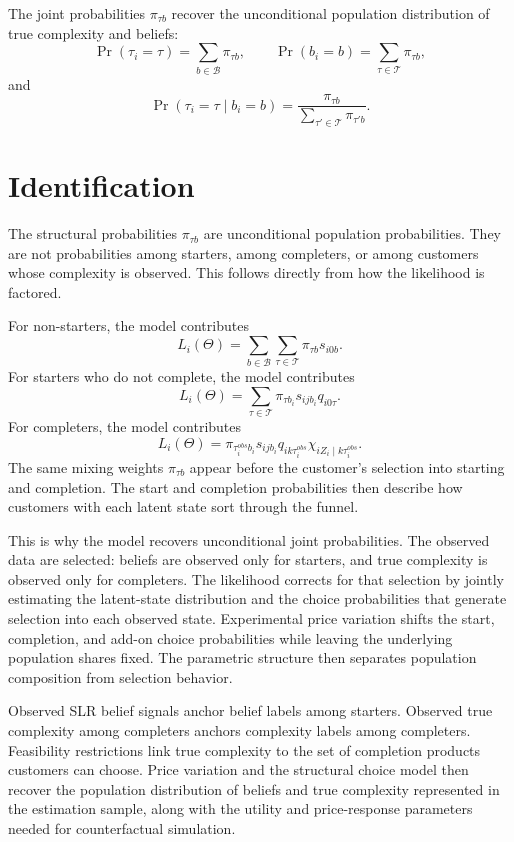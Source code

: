 \documentclass[11pt]{article}
\newcommand{\Tset}{\mathcal{T}}
\newcommand{\Bset}{\mathcal{B}}
\newcommand{\Prb}{\Pr}
\begin{document}
The joint probabilities $\pi_{\tau b}$ recover the unconditional population distribution of true complexity and beliefs:
\[
\Prb(\tau_i=\tau)=\sum_{b\in\Bset}\pi_{\tau b},
\qquad
\Prb(b_i=b)=\sum_{\tau\in\Tset}\pi_{\tau b},
\]
and
\[
\Prb(\tau_i=\tau\mid b_i=b)=
\frac{\pi_{\tau b}}{\sum_{\tau'\in\Tset}\pi_{\tau'b}}.
\]


\section{Identification}

The structural probabilities $\pi_{\tau b}$ are unconditional population probabilities. They are not probabilities among starters, among completers, or among customers whose complexity is observed. This follows directly from how the likelihood is factored.

For non-starters, the model contributes
\[
L_i(\Theta)=\sum_{b\in\Bset}\sum_{\tau\in\Tset}\pi_{\tau b}s_{i0b}.
\]
For starters who do not complete, the model contributes
\[
L_i(\Theta)=\sum_{\tau\in\Tset}\pi_{\tau b_i}s_{ijb_i}q_{i0\tau}.
\]
For completers, the model contributes
\[
L_i(\Theta)=\pi_{\tau_i^{obs}b_i}s_{ijb_i}q_{ik\tau_i^{obs}}\chi_{iZ_i\mid k\tau_i^{obs}}.
\]
The same mixing weights $\pi_{\tau b}$ appear before the customer's selection into starting and completion. The start and completion probabilities then describe how customers with each latent state sort through the funnel.

This is why the model recovers unconditional joint probabilities. The observed data are selected: beliefs are observed only for starters, and true complexity is observed only for completers. The likelihood corrects for that selection by jointly estimating the latent-state distribution and the choice probabilities that generate selection into each observed state. Experimental price variation shifts the start, completion, and add-on choice probabilities while leaving the underlying population shares fixed. The parametric structure then separates population composition from selection behavior.

Observed SLR belief signals anchor belief labels among starters. Observed true complexity among completers anchors complexity labels among completers. Feasibility restrictions link true complexity to the set of completion products customers can choose. Price variation and the structural choice model then recover the population distribution of beliefs and true complexity represented in the estimation sample, along with the utility and price-response parameters needed for counterfactual simulation.
\end{document}
